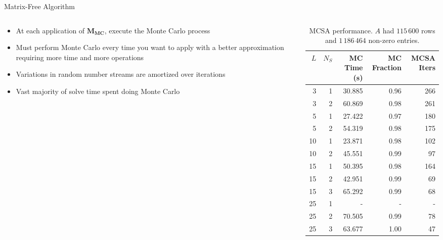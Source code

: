\documentclass{beamer}
\begin{document}
\begin{frame}{Matrix-Free Algorithm}

  \begin{columns}
    
    \begin{column}{0.4\textwidth}
      
      \begin{itemize}
        \small
      \item At each application of $\mathbf{M_{MC}}$, execute the Monte
        Carlo process
        \vfill
      \item Must perform Monte Carlo every time you want to apply with a better
        approximation requiring more time and more operations
        \vfill
      \item Variations in random number streams are amortized over iterations
        \vfill
      \item Vast majority of solve time spent doing Monte Carlo
      \end{itemize}

    \end{column}

    \begin{column}{0.6\textwidth}
      \begin{table}[htb!]
        \tiny
        \begin{center}
          \begin{tabular}{rrrrr}
            \toprule
            \multicolumn{1}{r}{$L$} &
            \multicolumn{1}{r}{$N_S$} &
            \multicolumn{1}{r}{MC Time (s)} &
            \multicolumn{1}{r}{MC Fraction} &
            \multicolumn{1}{r}{MCSA Iters}
            \\ \midrule
            3 & 1 & 30.885 & 0.96 & 266 \\
            3 & 2 & 60.869 & 0.98 & 261 \\
            5 & 1 & 27.422 & 0.97 & 180 \\
            5 & 2 & 54.319 & 0.98 & 175 \\
            10 & 1 & 23.871 & 0.98 & 102 \\
            10 & 2 & 45.551 & 0.99 & 97 \\
            15 & 1 & 50.395 & 0.98 & 164 \\
            15 & 2 & 42.951 & 0.99 & 69 \\
            15 & 3 & 65.292 & 0.99 & 68 \\
            25 & 1 & - & - & - \\
            25 & 2 & 70.505 & 0.99 & 78 \\
            25 & 3 & 63.677 & 1.00 & 47 \\
            \bottomrule
          \end{tabular}
        \end{center}
        \caption{\small MCSA performance. $A$ had $115\,600$ rows and
          $1\,186\,464$ non-zero entries.}
      \end{table} 


\end{column}
\end{columns}
\end{frame}
\end{document}

